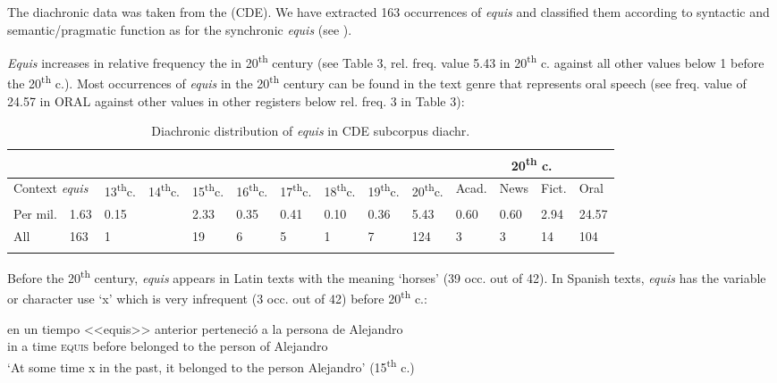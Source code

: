 \documentclass[output=paper
,modfonts
,nonflat]{langsci/langscibook}
\begin{document}
The diachronic data was taken from the (CDE). We have extracted 163 occurrences of \textit{equis} and classified them according to syntactic and semantic/pragmatic function as for the synchronic \textit{equis} (see ).

\textit{Equis} increases in relative frequency the in 20\textsuperscript{th} century (see Table 3, rel. freq. value 5.43 in 20\textsuperscript{th} c. against all other values below 1 before the 20\textsuperscript{th} c.). Most occurrences of \textit{equis} in the 20\textsuperscript{th} century can be found in the text genre that represents oral speech (see freq. value of 24.57 in ORAL against other values in other registers below rel. freq. 3 in Table 3):

\begin{table}
\caption{Diachronic distribution of \textit{equis} in CDE subcorpus diachr.}
\label{tab:3:Equis MexSp. CDE}
 \begin{tabularx}{\textwidth}{XXXXXXXXXX|XXXX} 
  \lsptoprule
 & &  &  &  &  &  &  &  &  & \multicolumn{4}{c}{20\textsuperscript{th} c.\cellcolor[gray]{0.8}}\\
  \midrule
  \multicolumn{2}{p{1.5cm}}{Context \textit{equis}} & 13\textsuperscript{th}c. & 14\textsuperscript{th}c. & 15\textsuperscript{th}c. & 16\textsuperscript{th}c. & 17\textsuperscript{th}c. & 18\textsuperscript{th}c. & 19\textsuperscript{th}c. & 20\textsuperscript{th}c. & Acad. & News & Fict. & Oral\\
  \midrule
  Per mil.  & 1.63 & 0.15 &  & 2.33 & 0.35 & 0.41 & 0.10 & 0.36 & 5.43\cellcolor[gray]{0.8} & 0.60 & 0.60 & 2.94 & \footnotesize 24.57\cellcolor[gray]{0.6}\\
  \midrule
  All & 163 & 1 &  & 19 & 6 & 5 & 1 & 7 & 124\cellcolor[gray]{0.8} & 3 & 3 & 14 & 104\cellcolor[gray]{0.6}\\
  \lspbottomrule
 \end{tabularx}
\end{table}

Before the 20\textsuperscript{th} century, \textit{equis} appears in Latin texts with the meaning ‘horses’ (39 occ. out of 42). In Spanish texts, \textit{equis} has the variable or character use ‘x’ which is very infrequent (3 occ. out of 42) before 20\textsuperscript{th} c.:

\ea
\gll en un tiempo <<equis>> anterior perteneció a la persona de Alejandro\\
in a time \textsc{equis} before belonged to the person of Alejandro\\
\glt ‘At some time x in the past, it belonged to the person Alejandro’ (15\textsuperscript{th} c.)
\z
\end{document}
